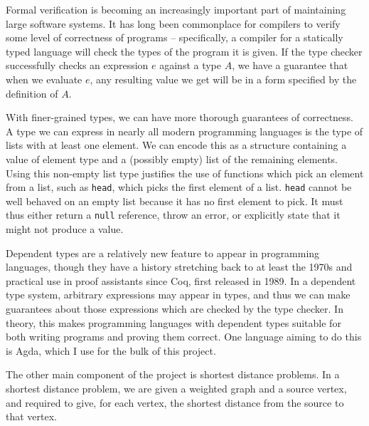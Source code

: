 Formal verification is becoming an increasingly important part of maintaining large software systems.
It has long been commonplace for compilers to verify some level of correctness of programs -- specifically, a compiler for a statically typed language will check the types of the program it is given.
If the type checker successfully checks an expression $e$ against a type $A$, we have a guarantee that when we evaluate $e$, any resulting value we get will be in a form specified by the definition of $A$.

With finer-grained types, we can have more thorough guarantees of correctness.
A type we can express in nearly all modern programming languages is the type of lists with at least one element.
We can encode this as a structure containing a value of element type and a (possibly empty) list of the remaining elements.
Using this non-empty list type justifies the use of functions which pick an element from a list, such as \texttt{head}, which picks the first element of a list.
\texttt{head} cannot be well behaved on an empty list because it has no first element to pick.
It must thus either return a \texttt{null} reference, throw an error, or explicitly state that it might not produce a value.

Dependent types are a relatively new feature to appear in programming languages, though they have a history stretching back to at least the 1970s\cite{martin-lof:aitot} and practical use in proof assistants since Coq\cite{CoqProofAssistant}, first released in 1989.
In a dependent type system, arbitrary expressions may appear in types, and thus we can make guarantees about those expressions which are checked by the type checker.
In theory, this makes programming languages with dependent types suitable for both writing programs and proving them correct.
One language aiming to do this is Agda\cite{Norell07}, which I use for the bulk of this project.

The other main component of the project is shortest distance problems.
In a shortest distance problem, we are given a weighted graph and a source vertex, and required to give, for each vertex, the shortest distance from the source to that vertex.
